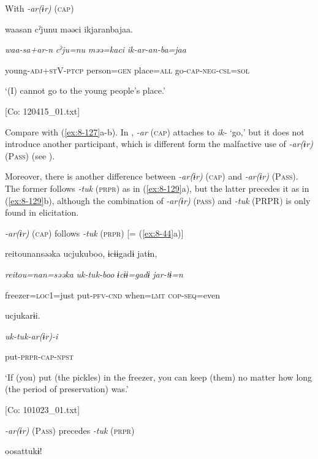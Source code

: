 \ea\label{ex:8-128}
  With \textit{{}-ar(ɨr)} (\textsc{cap})

  {\TM}
\glll  waasan  cˀjunu  məəci  ikjaranbajaa.

    \textit{waa-sa+ar-n}  \textit{cˀju=nu}  \textit{məə=kaci}  \textit{ik-ar{}-an-ba=jaa}

    young-\textsc{adj}+\textsc{st}V-\textsc{ptcp}  person=\textsc{gen}  place=\textsc{all}  go-\textsc{cap}-\textsc{neg}-\textsc{csl}=\textsc{sol}

    ‘(I) cannot go to the young people’s place.’

    [Co: 120415\_01.txt]
\z

Compare  with (\ref{ex:8-127}a-b). In , \textit{{}-ar} (\textsc{cap}) attaches to \textit{ik-} ‘go,’ but it does not introduce another participant, which is different form the malfactive use of \textit{{}-ar(ɨr)} (P\textsc{ass}) (see ).

  Moreover, there is another difference between \textit{{}-ar(ɨr)} (\textsc{cap}) and \textit{{}-ar(ɨr)} (P\textsc{ass}). The former follows \textit{{}-tuk} (\textsc{prpr}) as in (\ref{ex:8-129}a), but the latter precedes it as in (\ref{ex:8-129}b), although the combination of \textit{{}-ar(ɨr)} (\textsc{pass}) and \textit{{}-tuk} (PRPR) is only found in elicitation.

\ea\label{ex:8-129}
\ea \textit{{}-ar(ɨr)} (\textsc{cap}) follows \textit{{}-tuk} (\textsc{prpr}) [= (\ref{ex:8-44}a)]

  {\TM}
\glll  {\textbar}reitou{\textbar}nansəəka  ucjukuboo,  ɨcɨɨgadɨ  jatɨn,

    \textit{reitou=nan=səəka}  \textit{uk-tuk-boo}  \textit{ɨcɨɨ=gadɨ}  \textit{jar-tɨ=n}

    freezer=\textsc{loc}1=just  put-\textsc{pfv}-\textsc{cnd}  when=\textsc{lmt}  \textsc{cop}-\textsc{seq}=even

    ucjukarɨi.

    \textit{uk-tuk-ar(ɨr){}-i}

    put-\textsc{prpr}-\textsc{cap}-\textsc{npst}

    ‘If (you) put (the pickles) in the freezer, you can keep (them) no matter how long (the period of preservation) was.’

    [Co: 101023\_01.txt]
\z

\ex \textit{{}-ar(ɨr)} (P\textsc{ass}) precedes \textit{{}-tuk} (\textsc{prpr})

  {\TM}
\glll  oosattukɨ!

